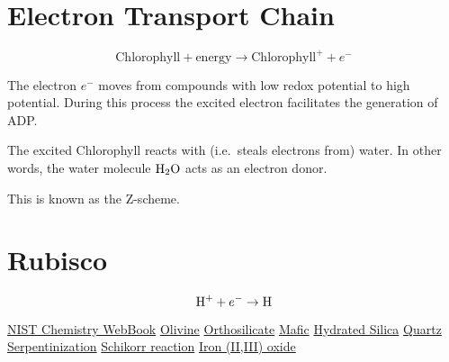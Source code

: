 \documentclass[a4paper,14pt]{extarticle}
\def\H{{\rm H}}
\def\O{{\rm O}}
\begin{document}
\section{Electron Transport Chain}
\[
    \text{Chlorophyll} + \text{energy} \rightarrow \text{Chlorophyll}^+ + e^-
\]

The electron $e^-$ moves from compounds with low redox potential to high potential. During this process
the excited electron facilitates the generation of ADP.\@

The excited Chlorophyll reacts with (i.e.\ steals electrons from) water.
In other words, the water molecule $\H_2\O$ acts as an electron donor.

This is known as the Z-scheme.

\section{Rubisco}
\[
    \H^+ + e^- \rightarrow \H {}
\]

\begin{thebibliography}{9}
                  \href{https://webbook.nist.gov/}{NIST Chemistry WebBook}
               \href{https://en.wikipedia.org/wiki/Olivine}{Olivine}
         \href{https://en.wikipedia.org/wiki/Orthosilicate}{Orthosilicate}
                 \href{https://en.wikipedia.org/wiki/Mafic}{Mafic}
       \href{https://en.wikipedia.org/wiki/Hydrated_silica}{Hydrated Silica}
                \href{https://en.wikipedia.org/wiki/Quartz}{Quartz}
      \href{https://en.wikipedia.org/wiki/Serpentinization}{Serpentinization}
     \href{https://en.wikipedia.org/wiki/Schikorr_reaction}{Schikorr reaction}
     \href{https://en.wikipedia.org/wiki/Iron(II,III)_oxide}{Iron (II,III) oxide}
\end{thebibliography}
\end{document}
